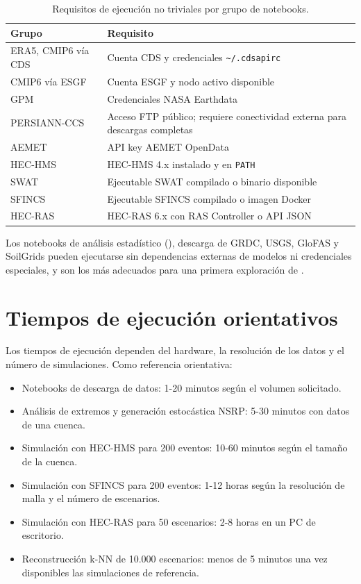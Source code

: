 \begin{table}[htbp]
  \centering
  \caption{Requisitos de ejecución no triviales por grupo de notebooks.}
  \label{tab:requisitos_notebooks}
  \begin{tabular}{p{}p{}}
    \toprule
    Grupo & Requisito \\
    \midrule
    ERA5, CMIP6 vía CDS & Cuenta CDS y credenciales \texttt{\~{}/.cdsapirc} \\
    CMIP6 vía ESGF & Cuenta ESGF y nodo activo disponible \\
    GPM & Credenciales NASA Earthdata \\
    PERSIANN-CCS & Acceso FTP público; requiere conectividad externa para descargas completas \\
    AEMET & API key AEMET OpenData \\
    HEC-HMS & HEC-HMS 4.x instalado y en \texttt{PATH} \\
    SWAT & Ejecutable SWAT compilado o binario disponible \\
    SFINCS & Ejecutable SFINCS compilado o imagen Docker \\
    HEC-RAS & HEC-RAS 6.x con RAS Controller o API JSON \\
    \bottomrule
  \end{tabular}
\end{table}

Los notebooks de análisis estadístico (), descarga de GRDC, USGS, GloFAS y SoilGrids pueden ejecutarse sin dependencias externas de modelos ni credenciales especiales, y son los más adecuados para una primera exploración de \pyhydra.

\section{Tiempos de ejecución orientativos}

Los tiempos de ejecución dependen del hardware, la resolución de los datos y el número de simulaciones. Como referencia orientativa:

\begin{itemize}
  \item Notebooks de descarga de datos: 1-20 minutos según el volumen solicitado.
  \item Análisis de extremos y generación estocástica NSRP: 5-30 minutos con datos de una cuenca.
  \item Simulación con HEC-HMS para 200 eventos: 10-60 minutos según el tamaño de la cuenca.
  \item Simulación con SFINCS para 200 eventos: 1-12 horas según la resolución de malla y el número de escenarios.
  \item Simulación con HEC-RAS para 50 escenarios: 2-8 horas en un PC de escritorio.
  \item Reconstrucción k-NN de 10.000 escenarios: menos de 5 minutos una vez disponibles las simulaciones de referencia.
\end{itemize}

